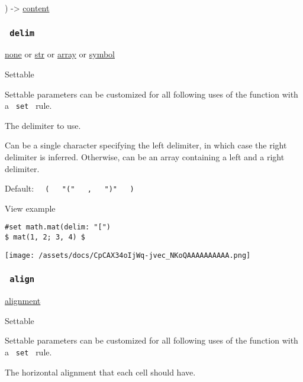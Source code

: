 ) -\textgreater{} \href{/docs/reference/foundations/content/}{content}

\subsubsection{\texorpdfstring{\texttt{\ delim\ }}{ delim }}\label{parameters-delim}

\href{/docs/reference/foundations/none/}{none} {or}
\href{/docs/reference/foundations/str/}{str} {or}
\href{/docs/reference/foundations/array/}{array} {or}
\href{/docs/reference/symbols/symbol/}{symbol}

{{ Settable }}

\label{parameters-delim-settable-tooltip}
Settable parameters can be customized for all following uses of the
function with a \texttt{\ set\ } rule.

The delimiter to use.

Can be a single character specifying the left delimiter, in which case
the right delimiter is inferred. Otherwise, can be an array containing a
left and a right delimiter.

Default:
\texttt{\ }{\texttt{\ (\ }}\texttt{\ }{\texttt{\ "("\ }}\texttt{\ }{\texttt{\ ,\ }}\texttt{\ }{\texttt{\ ")"\ }}\texttt{\ }{\texttt{\ )\ }}\texttt{\ }


View example

\begin{verbatim}
#set math.mat(delim: "[")
$ mat(1, 2; 3, 4) $
\end{verbatim}

\texttt{[image: /assets/docs/CpCAX34oIjWq-jvec\_NKoQAAAAAAAAAA.png]}

\subsubsection{\texorpdfstring{\texttt{\ align\ }}{ align }}\label{parameters-align}

\href{/docs/reference/layout/alignment/}{alignment}

{{ Settable }}

\label{parameters-align-settable-tooltip}
Settable parameters can be customized for all following uses of the
function with a \texttt{\ set\ } rule.

The horizontal alignment that each cell should have.


